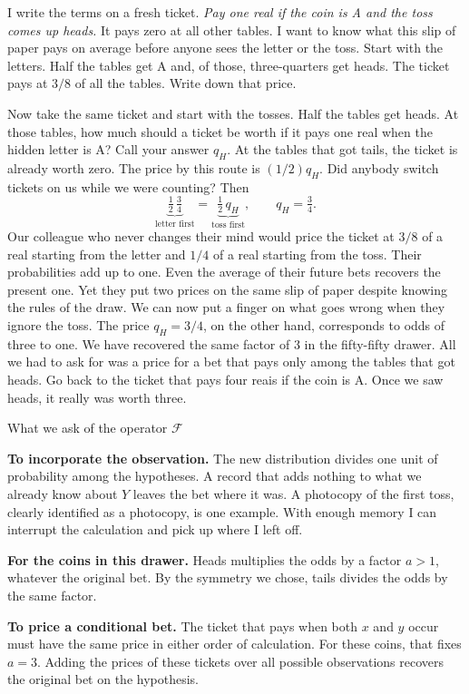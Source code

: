 \documentclass[12pt,oneside]{article}
\newcommand{\itemq}[1]{\par\textbf{#1.}\enspace}
\begin{document}
I write the terms on a fresh ticket. \emph{Pay one real if the coin is A and the toss comes up heads.} It pays zero at all other tables. I want to know what this slip of paper pays on average before anyone sees the letter or the toss. Start with the letters. Half the tables get A and, of those, three-quarters get heads. The ticket pays at $3/8$ of all the tables. Write down that price.

Now take the same ticket and start with the tosses. Half the tables get heads. At those tables, how much should a ticket be worth if it pays one real when the hidden letter is A? Call your answer $q_H$. At the tables that got tails, the ticket is already worth zero. The price by this route is $(1/2)q_H$. Did anybody switch tickets on us while we were counting? Then
\[
       \underbrace{\tfrac12\,\tfrac34}_{\text{letter first}}
       =\underbrace{\tfrac12\,q_H}_{\text{toss first}},
       \qquad q_H=\tfrac34 .
\]
Our colleague who never changes their mind would price the ticket at $3/8$ of a real starting from the letter and $1/4$ of a real starting from the toss. Their probabilities add up to one. Even the average of their future bets recovers the present one. Yet they put two prices on the same slip of paper despite knowing the rules of the draw. We can now put a finger on what goes wrong when they ignore the toss. The price $q_H=3/4$, on the other hand, corresponds to odds of three to one. We have recovered the same factor of 3 in the fifty-fifty drawer. All we had to ask for was a price for a bet that pays only among the tables that got heads. Go back to the ticket that pays four reais if the coin is A. Once we saw heads, it really was worth three.

\begin{quadro}{What we ask of the operator \(\mathcal F\)}
\itemq{To incorporate the observation} The new distribution divides one unit of probability among the hypotheses. A record that adds nothing to what we already know about $Y$ leaves the bet where it was. A photocopy of the first toss, clearly identified as a photocopy, is one example. With enough memory I can interrupt the calculation and pick up where I left off.
\itemq{For the coins in this drawer} Heads multiplies the odds by a factor $a>1$, whatever the original bet. By the symmetry we chose, tails divides the odds by the same factor.
\itemq{To price a conditional bet} The ticket that pays when both $x$ and $y$ occur must have the same price in either order of calculation. For these coins, that fixes $a=3$. Adding the prices of these tickets over all possible observations recovers the original bet on the hypothesis.
\end{quadro}
\end{document}
